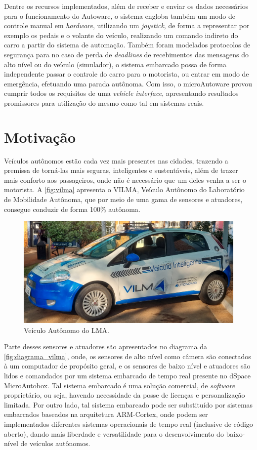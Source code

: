 Dentre os recursos implementados, além de receber e enviar os dados necessários para o funcionamento do Autoware, o sistema engloba também um modo de controle manual em \textit{hardware}, utilizando um \textit{joystick}, de forma a representar por exemplo os pedais e o volante do veículo, realizando um comando indireto do carro a partir do sistema de automação. Também foram modelados protocolos de segurança para no caso de perda de \textit{deadlines} de recebimentos das mensagens do alto nível ou do veículo (simulador), o sistema embarcado possa de forma independente passar o controle do carro para o motorista, ou entrar em modo de emergência, efetuando uma parada autônoma. Com isso, o microAutoware provou cumprir todos os requisitos de uma \textit{vehicle interface}, apresentando resultados promissores para utilização do mesmo como tal em sistemas reais.

\clearpage

\section{Motivação}

Veículos autônomos estão cada vez mais presentes nas cidades, trazendo a premissa de torná-las mais seguras, inteligentes e sustentáveis, além de trazer mais conforto aos passageiros, onde não é necessário que um deles venha a ser o motorista. A \autoref{fig:vilma} apresenta o VILMA, Veículo Autônomo do Laboratório de Mobilidade Autônoma, que por meio de uma gama de sensores e atuadores, consegue conduzir de forma 100\% autônoma.


\begin{figure}[H]
	\centering
	\includegraphics[width=0.5\linewidth]{img/vilma}
	\caption{Veículo Autônomo do LMA.}
	\label{fig:vilma}
\end{figure}

Parte desses sensores e atuadores são apresentados no diagrama da \autoref{fig:diagrama_vilma}, onde, os sensores de alto nível como câmera são conectados à um computador de propósito geral, e os sensores de baixo nível e atuadores são lidos e comandados por um sistema embarcado de tempo real presente no dSpace MicroAutobox. Tal sistema embarcado é uma solução comercial, de \textit{software} proprietário, ou seja, havendo necessidade da posse de licenças e personalização limitada. Por outro lado, tal sistema embarcado pode ser substituído por sistemas embarcados baseados na arquitetura ARM-Cortex, onde podem ser implementados diferentes sistemas operacionais de tempo real (inclusive de código aberto), dando mais liberdade e versatilidade para o desenvolvimento do baixo-nível de veículos autônomos.

